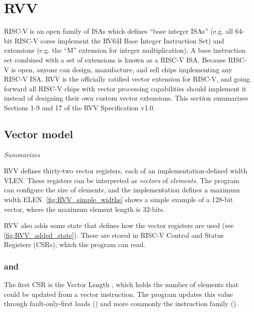 \section{RVV}\label{chap:bg:sec:rvv}
RISC-V is an open family of ISAs which defines ``base integer ISAs'' (e.g. all 64-bit RISC-V cores implement the RV64I Base Integer Instruction Set) and extensions (e.g. the ``M'' extension for integer multiplication).
A base instruction set combined with a set of extensions is known as a RISC-V ISA.
Because RISC-V is open, anyone can design, manufacture, and sell chips implementing any RISC-V ISA.
RVV is the officially ratified vector extension for RISC-V, and going forward all RISC-V chips with vector processing capabilities should implement it instead of designing their own custom vector extensions.
This section summarizes Sections 1-9 and 17 of the RVV Specification v1.0\cite{RISCVVectorExtension2021}.

\subsection{Vector model}
\emph{Summarizes \cite[Sections 1-4]{RISCVVectorExtension2021}}




RVV defines thirty-two vector registers, each of an implementation-defined width VLEN.
These registers can be interpreted as \emph{vectors} of \emph{elements}.
The program can configure the size of elements, and the implementation defines a maximum width ELEN.
\cref{fig:RVV_simple_widths} shows a simple example of a 128-bit vector, where the maximum element length is 32-bits.


RVV also adds some state that defines how the vector registers are used (see \cref{fig:RVV_added_state}).
These are stored in RISC-V Control and Status Registers (CSRs), which the program can read.

\subsubsection{ and }\label{chap:bg:sec:rvv:vstart}
The first CSR is the Vector Length , which holds the number of elements that could be updated from a vector instruction.
The program updates this value through fault-only-first loads () and more commonly the  instruction family ().

